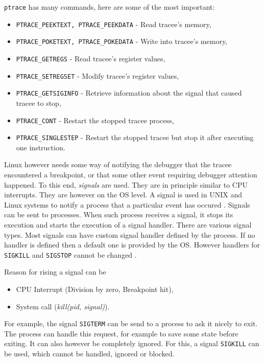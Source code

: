 \texttt{ptrace} has many commands, here are some of the most important:
\begin{itemize}
    \item \texttt{PTRACE\_PEEKTEXT, PTRACE\_PEEKDATA} - Read tracee's memory,
    \item \texttt{PTRACE\_POKETEXT, PTRACE\_POKEDATA} - Write into tracee's memory,
    \item \texttt{PTRACE\_GETREGS} - Read tracee's register values,
    \item \texttt{PTRACE\_SETREGSET} - Modify tracee's register values,
    \item \texttt{PTRACE\_GETSIGINFO} - Retrieve information about the signal
                                        that caused tracee to stop,
    \item \texttt{PTRACE\_CONT} - Restart the stopped tracee process,
    \item \texttt{PTRACE\_SINGLESTEP} - Restart the stopped tracee but
          stop it after executing one instruction.
\end{itemize}

Linux however needs some way of notifying the debugger that the tracee
encountered a breakpoint, or that some other event requiring debugger attention
happened. To this end, \textit{signals} are used. They are in principle similar
to CPU interrupts. They are however on the OS level. A signal is used in UNIX
and Linux systems to notify a process that a particular event has occured
\cite{os-concepts}. Signals can be sent to processes. When such process
receives a signal, it stops its execution and starts the execution of a signal
handler. There are various signal types. Most signals can have custom signal
handler defined by the process. If no handler is defined then a default one is
provided by the OS. However handlers for \texttt{SIGKILL} and \texttt{SIGSTOP}
cannot be changed \cite{signals}.

Reason for rising a signal can be 
\begin{itemize}
    \item CPU Interrupt (Division by zero, Breakpoint hit),
    \item System call (\textit{kill(pid, signal)}).
\end{itemize}

For example, the signal \texttt{SIGTERM} can be send to a process to ask it
nicely to exit. The process can handle this request, for example to save some
state before exiting. It can also however be completely ignored. For this, a
signal \texttt{SIGKILL} can be used, which cannot be handled, ignored or
blocked.

